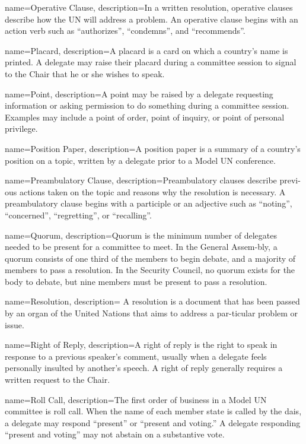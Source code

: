 {
	name={Operative Clause},
	description={In a written resolution, operative clauses describe how the UN will address a problem. An operative clause begins with an action verb such as ``authorizes'', ``condemns'', and ``recommends''.}
}

{
	name={Placard},
	description={A placard is a card on which a country’s name is printed.  A delegate may raise their placard during a committee session to signal to the Chair that he or she wishes to speak.}
}

{
	name={Point},
	description={A point may be raised by a delegate requesting information or asking permission to do something during a committee session. Examples may include a point of order, point of inquiry, or point of personal privilege.}
}

{
	name={Position Paper},
	description={A position paper is a summary of a country’s position on a topic, written by a delegate prior to a Model UN conference.}
}

{
	name={Preambulatory Clause},
	description={Preambulatory clauses describe previ-ous actions taken on the topic and reasons why the resolution is necessary. A preambulatory clause begins with a participle or an adjective such as ``noting'', ``concerned'', ``regretting'', or ``recalling''.}
}

{
	name={Quorum},
	description={Quorum is the minimum number of delegates needed to be present for a committee to meet. In the General Assem-bly, a quorum consists of one third of the members to begin debate, and a majority of members to pass a resolution. In the Security Council, no quorum exists for the body to debate, but nine members must be present to pass a resolution.}
}

{
	name={Resolution},
	description={ A resolution is a document that has been passed by an organ of the United Nations that aims to address a par-ticular problem or issue.}
}

{
	name={Right of Reply},
	description={A right of reply is the right to speak in response to a previous speaker’s comment, usually when a delegate feels personally insulted by another’s speech. A right of reply generally requires a written request to the Chair.}
}


{
	name={Roll Call},
	description={The first order of business in a Model UN committee is roll call. When the name of each member state is called by the dais, a delegate may respond “present” or “present and voting.” A delegate responding “present and voting” may not abstain on a substantive vote.}
}

